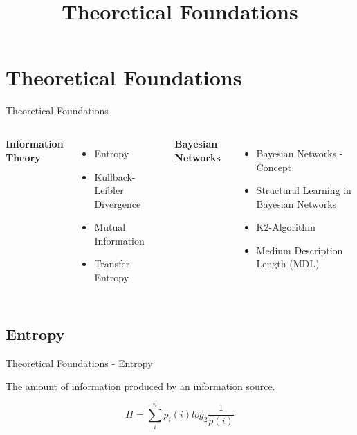 \section{ Theoretical Foundations}

\title[Theoretical Foundations]{Theoretical Foundations}

\begin{frame}{{Theoretical Foundations}}
     \begin{columns}
            \textbf{Information Theory}
            \begin{itemize}
                \item Entropy
                \item Kullback-Leibler Divergence
                \item Mutual Information
                \item Transfer Entropy
            \end{itemize}

            \textbf{Bayesian Networks}
            \begin{itemize}
                \item Bayesian Networks - Concept
                \item Structural Learning in Bayesian Networks
                \item K2-Algorithm
                \item Medium Description Length (MDL)
            \end{itemize}
	\end{columns}



\end{frame}

\subsection{Entropy}
\begin{frame}{Theoretical Foundations - Entropy}

	       
	        
	      

\begin{definition}
The amount of information produced by an information source.

\begin{equation}
\label{eq:shannon}
     H = \sum_{i}^{n} p_{i}(i)log_{2}\frac{1}{p(i)}
\end{equation}
\end{definition}

\end{frame}

